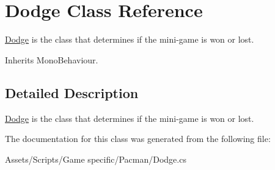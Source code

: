 \hypertarget{class_dodge}{\section{Dodge Class Reference}
\label{class_dodge}
}


\hyperlink{class_dodge}{Dodge} is the class that determines if the mini-\/game is won or lost.  




Inherits Mono\-Behaviour.



\subsection{Detailed Description}
\hyperlink{class_dodge}{Dodge} is the class that determines if the mini-\/game is won or lost. 



The documentation for this class was generated from the following file\-:\begin{DoxyCompactItemize}
\item 
Assets/\-Scripts/\-Game specific/\-Pacman/Dodge.\-cs\end{DoxyCompactItemize}
